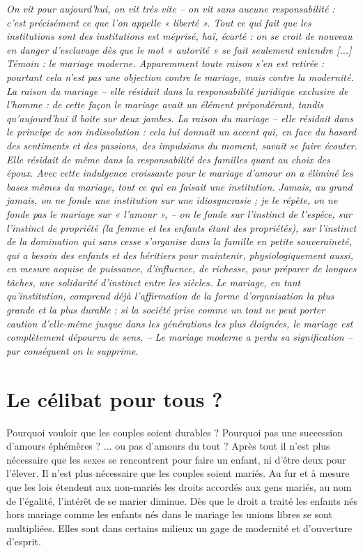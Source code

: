 \begin{displayquote}
%
\emph{On vit pour aujourd'hui, on vit très vite -- on vit sans aucune responsabilité : c'est précisément ce que l'on appelle « liberté ». Tout ce qui fait que les institutions sont des institutions est méprisé, haï, écarté : on se croit de nouveau en danger d'esclavage dès que le mot « autorité » se fait seulement entendre \emph{[...]} Témoin : \emph{le mariage moderne}. Apparemment toute raison s'en est retirée : pourtant cela n'est pas une objection contre le mariage, mais contre la modernité. La raison du mariage -- elle résidait dans la responsabilité juridique exclusive de l'homme : de cette façon le mariage avait un élément prépondérant, tandis qu'aujourd'hui il boite sur deux jambes. La raison du mariage -- elle résidait dans le principe de son indissolution : cela lui donnait un accent qui, en face du hasard des sentiments et des passions, des impulsions du moment, \emph{savait se faire écouter}. Elle résidait de même dans la responsabilité des familles quant au choix des époux. Avec cette indulgence croissante pour le mariage \emph{d'amour} on a éliminé les bases mêmes du mariage, tout ce qui en faisait une institution. Jamais, au grand jamais, on ne fonde une institution sur une idiosyncrasie ; je le répète, on ne fonde pas le mariage sur « l'amour », -- on le fonde sur l'instinct de l'espèce, sur l'instinct de propriété (la femme et les enfants étant des propriétés), sur \emph{l'instinct de la domination} qui sans cesse s'organise dans la famille en petite souveraineté, qui a \emph{besoin} des enfants et des héritiers pour maintenir, physiologiquement aussi, en mesure acquise de puissance, d'influence, de richesse, pour préparer de longues tâches, une solidarité d'instinct entre les siècles. Le mariage, en tant qu'institution, comprend déjà l'affirmation de la forme d'organisation la plus grande et la plus durable : si la société prise comme un tout ne peut \emph{porter caution} d'elle-même jusque dans les générations les plus éloignées, le mariage est complètement dépourvu de sens. -- Le mariage moderne a perdu sa signification -- par conséquent on le supprime.}  
%
\end{displayquote}

 \chapter{Le célibat pour tous ?}
 
Pourquoi vouloir que les couples soient durables ? Pourquoi pas une succession d'amours éphémères ?  ... ou pas d'amours du tout ? Après tout il n'est plus nécessaire que les sexes se rencontrent pour faire un enfant, ni d'être deux pour l'élever. 
Il n'est plus nécessaire que les couples soient mariés. Au fur et à mesure que les lois étendent aux non-mariés les droits accordés aux gens mariés, au nom de l'égalité, l'intérêt de se marier diminue. Dès que le droit a traité les enfants nés hors mariage comme les enfants nés dans le mariage les unions libres se sont multipliées. Elles sont dans certains milieux un gage de modernité et d'ouverture d'esprit. 

